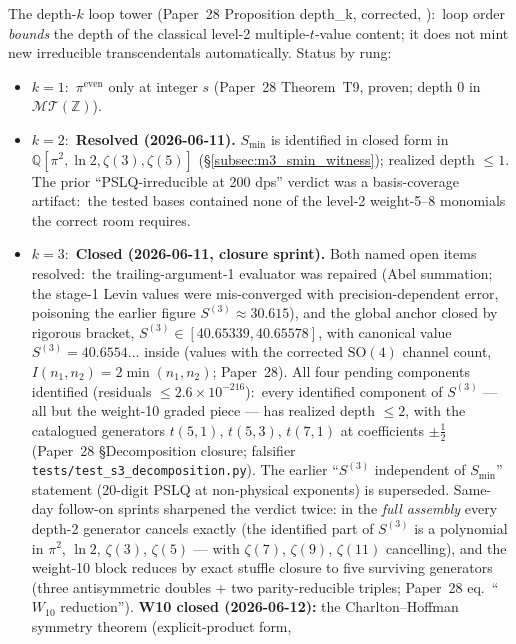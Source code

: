 \documentclass[11pt,a4paper]{article}
\theoremstyle{plain}
\theoremstyle{definition}
\newcommand{\Z}{\mathbb{Z}}
\newcommand{\Q}{\mathbb{Q}}
\newcommand{\MT}{\mathcal{MT}}
\begin{document}
The depth-$k$ loop tower (Paper~28 Proposition depth\_k, corrected,
\cite{loutey_paper28}):\ loop order \emph{bounds} the depth of the
classical level-2 multiple-$t$-value content; it does not mint new
irreducible transcendentals automatically.  Status by rung:
\begin{itemize}
  \item $k = 1$:\ $\pi^{\mathrm{even}}$ only at integer $s$ (Paper~28 Theorem~T9,
    proven; depth $0$ in $\MT(\Z)$).
  \item $k = 2$:\ \textbf{Resolved (2026-06-11).}  $S_{\min}$ is
    identified in closed form in $\Q[\pi^2, \ln 2, \zeta(3), \zeta(5)]$
    (\S\ref{subsec:m3_smin_witness}); realized depth $\le 1$.  The
    prior ``PSLQ-irreducible at 200 dps'' verdict was a basis-coverage
    artifact:\ the tested bases contained none of the level-2
    weight-5--8 monomials the correct room requires.
  \item $k = 3$:\ \textbf{Closed (2026-06-11, closure sprint).}
    Both named open items resolved:\ the trailing-argument-1
    evaluator was repaired (Abel summation; the stage-1 Levin values
    were mis-converged with precision-dependent error, poisoning the
    earlier figure $S^{(3)} \approx 30.615$), and the global anchor
    closed by rigorous bracket, $S^{(3)} \in [40.65339, 40.65578]$,
    with canonical value $S^{(3)} = 40.6554\ldots$ inside (values with
    the corrected $\mathrm{SO}(4)$ channel count, $I(n_1,n_2) = 2\min(n_1,n_2)$;
    Paper~28).  All four
    pending components identified (residuals
    $\le 2.6\times10^{-216}$):\ every identified component of
    $S^{(3)}$ --- all but the weight-10 graded piece --- has realized
    depth $\le 2$, with the catalogued generators $t(5,1)$, $t(5,3)$,
    $t(7,1)$ at coefficients $\pm\tfrac12$ (Paper~28
    \S{}Decomposition closure; falsifier
    \texttt{tests/test\_s3\_decomposition.py}).  The earlier
    ``$S^{(3)}$ independent of $S_{\min}$'' statement (20-digit PSLQ
    at non-physical exponents) is superseded.  Same-day follow-on
    sprints sharpened the verdict twice: in the \emph{full assembly}
    every depth-2 generator cancels exactly (the identified part of
    $S^{(3)}$ is a polynomial in $\pi^2$, $\ln 2$, $\zeta(3)$, $\zeta(5)$ ---
    with $\zeta(7)$, $\zeta(9)$, $\zeta(11)$ cancelling), and the weight-10 block reduces by exact stuffle
    closure to five surviving generators (three antisymmetric doubles
    + two parity-reducible triples; Paper~28
    eq.~``$W_{10}$ reduction'').  \textbf{W10 closed (2026-06-12):}
    the Charlton--Hoffman symmetry theorem (explicit-product form,

\end{itemize}
\end{document}
